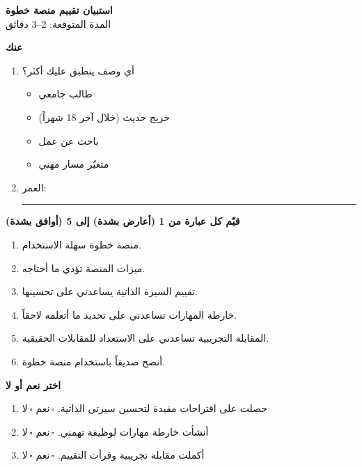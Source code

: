 ﻿\documentclass[12pt]{article}
\begin{document}
\begin{center}
  {\huge\bfseries استبيان تقييم منصة خطوة}\\[6pt]
  {\small المدة المتوقعة: 2--3 دقائق}
\end{center}

\vspace{1em}

{\Large\bfseries عنك}

\begin{enumerate}
  \item أي وصف ينطبق عليك أكثر؟
    \begin{itemize}
      \item طالب جامعي
      \item خريج حديث (خلال آخر 18 شهراً)
      \item باحث عن عمل
      \item متغيّر مسار مهني
    \end{itemize}
  \item العمر: \rule{4cm}{0.4pt}
\end{enumerate}

\vspace{0.8em}
{\Large\bfseries قيّم كل عبارة من 1 (أعارض بشدة) إلى 5 (أوافق بشدة)}

\begin{enumerate}[start=3]
  \item منصة خطوة سهلة الاستخدام. \hfill {}\,\,\,\,
  \item ميزات المنصة تؤدي ما أحتاجه. \hfill {}\,\,\,\,
  \item تقييم السيرة الذاتية يساعدني على تحسينها. \hfill {}\,\,\,\,
  \item خارطة المهارات تساعدني على تحديد ما أتعلمه لاحقاً. \hfill {}\,\,\,\,
  \item المقابلة التجريبية تساعدني على الاستعداد للمقابلات الحقيقية. \hfill {}\,\,\,\,
  \item أنصح صديقاً باستخدام منصة خطوة. \hfill {}\,\,\,\,
\end{enumerate}

\vspace{0.8em}
{\Large\bfseries اختر نعم أو لا}

\begin{enumerate}[start=9]
  \item حصلت على اقتراحات مفيدة لتحسين سيرتي الذاتية. \hfill $\square$\,نعم \quad $\square$\,لا
  \item أنشأت خارطة مهارات لوظيفة تهمني. \hfill $\square$\,نعم \quad $\square$\,لا
  \item أكملت مقابلة تجريبية وقرأت التقييم. \hfill $\square$\,نعم \quad $\square$\,لا
\end{enumerate}
\end{document}
